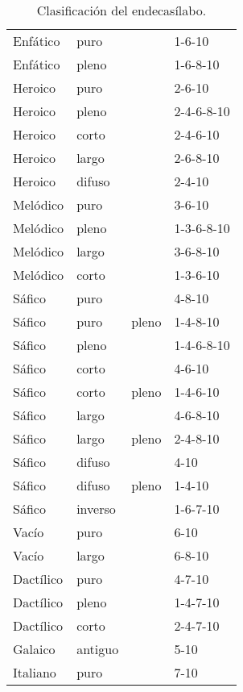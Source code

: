 \begin{table}[!ht]
	\centering\small
	\begin{tabular}{llll}
		\toprule
		Enfático&puro&&1-6-10\\
		Enfático&pleno&&1-6-8-10\\
		Heroico&puro&&2-6-10\\
		Heroico&pleno&&2-4-6-8-10\\
		Heroico&corto&&2-4-6-10\\
		Heroico&largo&&2-6-8-10\\
		Heroico&difuso&&2-4-10\\
		Melódico&puro&&3-6-10\\
		Melódico&pleno&&1-3-6-8-10\\
		Melódico&largo&&3-6-8-10\\
		Melódico&corto&&1-3-6-10\\
		Sáfico&puro&&4-8-10\\
		Sáfico&puro&pleno&1-4-8-10\\
		Sáfico&pleno&&1-4-6-8-10\\
		Sáfico&corto&&4-6-10\\
		Sáfico&corto&pleno&1-4-6-10\\
		Sáfico&largo&&4-6-8-10\\
		Sáfico&largo&pleno&2-4-8-10\\
		Sáfico&difuso&&4-10\\
		Sáfico&difuso&pleno&1-4-10\\
		Sáfico&inverso&&1-6-7-10\\
		Vacío&puro&&6-10\\
		Vacío&largo&&6-8-10\\
		Dactílico&puro&&4-7-10\\
		Dactílico&pleno&&1-4-7-10\\
		Dactílico&corto&&2-4-7-10\\
		Galaico&antiguo&&5-10\\
		Italiano&puro&&7-10\\
		\bottomrule
	\end{tabular}
	\caption{Clasificación del endecasílabo.}
	\label{tab:endecasilabos}
\end{table}

